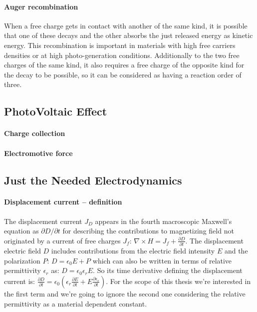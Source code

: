 \paragraph{Auger recombination} When a free charge gets in contact with another of the same kind, it is possible that one of these decays and the other absorbs the just released energy as kinetic energy. This recombination is important in materials with high free carriers densities or at high photo-generation conditions. Additionally to the two free charges of the same kind, it also requires a free charge of the opposite kind for the decay to be possible, so it can be considered as having a reaction order of three.

\subsection{PhotoVoltaic Effect}

\paragraph{Charge collection}

\paragraph{Electromotive force}

	
\subsection{Just the Needed Electrodynamics}
	
	\paragraph{Displacement current -- definition}\label{intro_displacement_current} The displacement current $J_D$ appears in the fourth macroscopic Maxwell's equation as $\partial D / \partial t$ for describing the contributions to magnetizing field not originated by a current of free charges $J_f$: $\nabla \times H = J_f + \frac{\partial D}{\partial t}$. The displacement electric field $D$ includes contributions from the electric field intensity $E$ and the polarization $P$: $D=\epsilon_0 E + P$ which can also be written in terms of relative permittivity $\epsilon_r$ as: $D= \epsilon_0 \epsilon_r E$. So its time derivative defining the displacement current is: $\frac{\partial D}{\partial t} = \epsilon_0 (\epsilon_r\frac{\partial E}{\partial t} + E\frac{\partial \epsilon_r}{\partial t})$. For the scope of this thesis we're interested in the first term and we're going to ignore the second one considering the relative permittivity as a material dependent constant.
	
